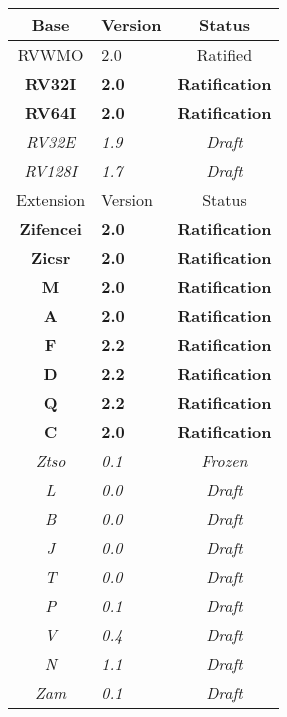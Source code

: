 {
\begin{table}[hbt]
  \centering
  \begin{tabular}{|c|l|c|}
    \hline
    Base           & Version & Status\\
    \hline
    RVWMO          & 2.0 & Ratified   \\
    \bf RV32I      & \bf 2.0 & \bf Ratification \\
    \bf RV64I      & \bf 2.0 & \bf Ratification \\
    \em RV32E      & \em 1.9 & \em Draft \\
    \em RV128I     & \em 1.7 & \em Draft \\
    \hline
    Extension      & Version & Status \\
    \hline
    \bf Zifencei   & \bf 2.0 & \bf Ratification \\
    \bf Zicsr      & \bf 2.0 & \bf Ratification \\
    \bf M          & \bf 2.0 & \bf Ratification \\
    \bf A          & \bf 2.0 & \bf Ratification \\
    \bf F          & \bf 2.2 & \bf Ratification \\
    \bf D          & \bf 2.2 & \bf Ratification \\
    \bf Q          & \bf 2.2 & \bf Ratification \\
    \bf C          & \bf 2.0 & \bf Ratification \\
    \em Ztso       & \em 0.1 & \em Frozen \\
    \em L          & \em 0.0 & \em Draft \\
    \em B          & \em 0.0 & \em Draft \\
    \em J          & \em 0.0 & \em Draft \\
    \em T          & \em 0.0 & \em Draft \\
    \em P          & \em 0.1 & \em Draft \\
    \em V          & \em 0.4 & \em Draft \\
    \em N          & \em 1.1 & \em Draft \\
    \em Zam        & \em 0.1 & \em Draft \\
    \hline
  \end{tabular}
\end{table}
}

